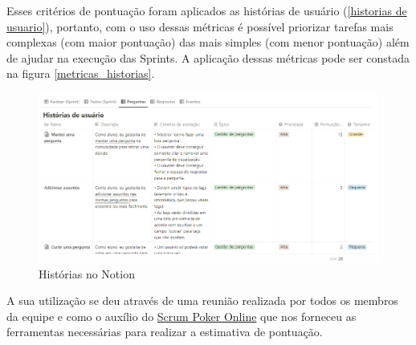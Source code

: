 Esses critérios de pontuação foram aplicados as histórias de usuário (\autoref{historias de usuario}), portanto, com o uso dessas métricas é possível priorizar tarefas mais complexas (com maior pontuação) das mais simples (com menor pontuação) além de ajudar na execução das \glspl{Sprint}. A aplicação dessas métricas pode ser constada na figura \autoref{metricas_historias}.

\begin{figure}[htb]
\centering
\caption{Histórias no Notion}
\label{metricas_historias}
\includegraphics[width=1.0\textwidth]{anexos/Imagens_Desenvolvimento/metricas_historias.png}
\end{figure}
\FloatBarrier

A sua utilização se deu através de uma reunião realizada por todos os membros da equipe e como o auxílio do \href{https://www.scrumpoker-online.org/en/}{Scrum Poker Online} que nos forneceu as ferramentas necessárias para realizar a estimativa de pontuação.



